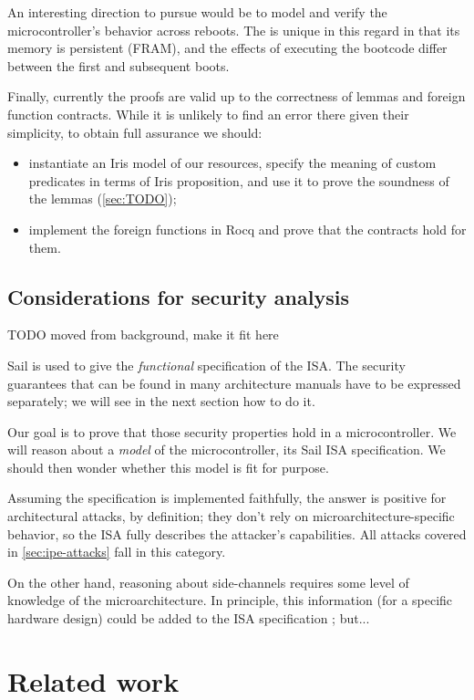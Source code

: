 An interesting direction to pursue would be to model and verify the microcontroller's behavior across reboots. The \msp is unique in this regard in that its memory is persistent (FRAM), and the effects of executing the bootcode differ between the first and subsequent boots.

Finally, currently the proofs are valid up to the correctness of lemmas and foreign function contracts. While it is unlikely to find an error there given their simplicity, to obtain full assurance we should:
\begin{itemize}
\item instantiate an Iris model of our resources, \ie specify the meaning of custom predicates in terms of Iris proposition, and use it to prove the soundness of the lemmas (\cref{sec:TODO});
\item implement the foreign functions in Rocq and prove that the contracts hold for them.
\end{itemize}

\subsection{Considerations for security analysis}

TODO moved from background, make it fit here

Sail is used to give the \emph{functional} specification of the ISA. The security guarantees that can be found in many architecture manuals have to be expressed separately; we will see in the next section how to do it.

Our goal is to prove that those security properties hold in a microcontroller. We will reason about a \emph{model} of the microcontroller, its Sail ISA specification. We should then wonder whether this model is fit for purpose.

Assuming the specification is implemented faithfully, the answer is positive for architectural attacks, by definition; they don't rely on microarchitecture-specific behavior, so the ISA fully describes the attacker's capabilities. All attacks covered in \cref{sec:ipe-attacks} fall in this category.

On the other hand, reasoning about side-channels requires some level of knowledge of the microarchitecture. In principle, this information (for a specific hardware design) could be added to the ISA specification ; but...

\section{Related work}

